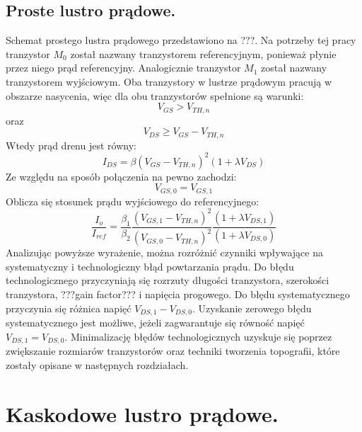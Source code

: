 \documentclass[10pt,a4paper,twoside]{report}
\theoremstyle{definition}
\theoremstyle{definition}
\theoremstyle{definition}
\theoremstyle{definition}
\theoremstyle{definition}
\begin{document}
	\subsection{ Proste lustro prądowe.}
	{ Schemat prostego lustra prądowego przedstawiono na ???. Na potrzeby tej pracy tranzystor $M_0$ został nazwany tranzystorem referencyjnym, ponieważ płynie przez niego prąd referencyjny. Analogicznie tranzystor $M_1$ został nazwany tranzystorem wyjściowym. Oba tranzystory w lustrze prądowym pracują w obszarze nasycenia, więc dla obu tranzystorów spełnione są warunki:
	\begin{equation} \label{eq_cutoff}
	V_{GS} > V_{TH,n}
	\end{equation}
	oraz
	\begin{equation} \label{eq_saturation}
	V_{DS} \ge V_{GS} - V_{TH,n}
	\end{equation}
	Wtedy prąd drenu jest równy:
	\begin{equation}
	I_{DS} = \beta \left( V_{GS} - V_{TH,n} \right)^2 \left(1+\lambda V_{DS} \right)
	\end{equation}
	Ze względu na sposób połączenia na pewno zachodzi:
	\begin{equation}
		V_{GS,0} = V_{GS,1}
	\end{equation} 
	Oblicza się stosunek prądu wyjściowego do referencyjnego:
	\begin{equation}
	\frac{I_o}{I_{ref}} =\frac{\beta_1}{\beta_2} \frac{(V_{GS,1}-V_{TH,n})^2}{(V_{GS,0}-V_{TH,n})^2} \frac{\left(1+\lambda V_{DS,1} \right)}{\left(1+\lambda V_{DS,0} \right)}
	\end{equation}
	Analizując powyższe wyrażenie, można rozróżnić czynniki wpływające na systematyczny i technologiczny błąd powtarzania prądu. Do błędu technologicznego przyczyniają się rozrzuty długości tranzystora, szerokości tranzystora, ???gain factor??? i napięcia progowego. Do błędu systematycznego przyczynia się różnica napięć $V_{DS,1} - V_{DS,0}$. Uzyskanie zerowego błędu systematycznego jest możliwe, jeżeli zagwarantuje się równość napięć $V_{DS,1} = V_{DS,0}$. Minimalizację błędów technologicznych uzyskuje się poprzez zwiększanie rozmiarów tranzystorów oraz techniki tworzenia topografii, które zostały opisane w następnych rozdziałach.

	\section{Kaskodowe lustro prądowe.}
	
}
\end{document}

